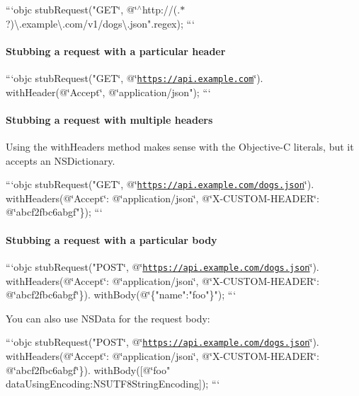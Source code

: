 ```objc stub\-Request("G\-E\-T\char`\"{}, @\char`\"{}$^\wedge$http\-://(.$\ast$?)\textbackslash{}.example\textbackslash{}.com/v1/dogs\textbackslash{}.json".regex); ```

\paragraph*{Stubbing a request with a particular header}

```objc stub\-Request("G\-E\-T\char`\"{}, @\char`\"{}\href{https://api.example.com}{\tt https\-://api.\-example.\-com}\char`\"{}).
with\-Header(@\char`\"{}Accept\char`\"{}, @\char`\"{}application/json"); ```

\paragraph*{Stubbing a request with multiple headers}

Using the {\ttfamily with\-Headers} method makes sense with the Objective-\/\-C literals, but it accepts an N\-S\-Dictionary.

```objc stub\-Request("G\-E\-T\char`\"{}, @\char`\"{}\href{https://api.example.com/dogs.json}{\tt https\-://api.\-example.\-com/dogs.\-json}\char`\"{}).
with\-Headers(@\char`\"{}Accept\char`\"{}\-: @\char`\"{}application/json\char`\"{}, @\char`\"{}X-\/\-C\-U\-S\-T\-O\-M-\/\-H\-E\-A\-D\-E\-R\char`\"{}\-: @\char`\"{}abcf2fbc6abgf"\}); ```

\paragraph*{Stubbing a request with a particular body}

```objc stub\-Request("P\-O\-S\-T\char`\"{}, @\char`\"{}\href{https://api.example.com/dogs.json}{\tt https\-://api.\-example.\-com/dogs.\-json}\char`\"{}).
with\-Headers(@\char`\"{}Accept\char`\"{}\-: @\char`\"{}application/json\char`\"{}, @\char`\"{}X-\/\-C\-U\-S\-T\-O\-M-\/\-H\-E\-A\-D\-E\-R\char`\"{}\-: @\char`\"{}abcf2fbc6abgf\char`\"{}\}).
with\-Body(@\char`\"{}\{"name"\-:"foo"\}"); ```

You can also use {\ttfamily N\-S\-Data} for the request body\-:

```objc stub\-Request("P\-O\-S\-T\char`\"{}, @\char`\"{}\href{https://api.example.com/dogs.json}{\tt https\-://api.\-example.\-com/dogs.\-json}\char`\"{}).
with\-Headers(@\char`\"{}Accept\char`\"{}\-: @\char`\"{}application/json\char`\"{}, @\char`\"{}X-\/\-C\-U\-S\-T\-O\-M-\/\-H\-E\-A\-D\-E\-R\char`\"{}\-: @\char`\"{}abcf2fbc6abgf\char`\"{}\}).
with\-Body(\mbox{[}@\char`\"{}foo" data\-Using\-Encoding\-:N\-S\-U\-T\-F8\-String\-Encoding\mbox{]}); ```


